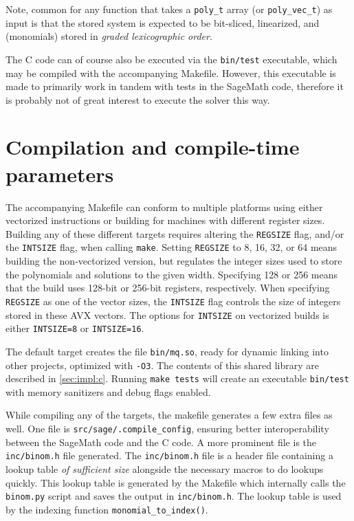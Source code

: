 Note, common for any function that takes a \texttt{poly\_t} array (or \texttt{poly\_vec\_t}) as input is that the stored system is expected to be bit-sliced, linearized, and (monomials) stored in \textit{graded lexicographic order}.

The C code can of course also be executed via the \texttt{bin/test} executable, which may be compiled with the accompanying Makefile. However, this executable is made to primarily work in tandem with tests in the SageMath code, therefore it is probably not of great interest to execute the solver this way.

\section{Compilation and compile-time parameters} \label{sec:impl:compile}
The accompanying Makefile can conform to multiple platforms using either vectorized instructions or building for machines with different register sizes. Building any of these different targets requires altering the \texttt{REGSIZE} flag, and/or the \texttt{INTSIZE} flag, when calling \texttt{make}. Setting \texttt{REGSIZE} to 8, 16, 32, or 64 means building the non-vectorized version, but regulates the integer sizes used to store the polynomials and solutions to the given width. Specifying 128 or 256 means that the build uses 128-bit or 256-bit registers, respectively. When specifying \texttt{REGSIZE} as one of the vector sizes, the \texttt{INTSIZE} flag controls the size of integers stored in these AVX vectors. The options for \texttt{INTSIZE} on vectorized builds is either \texttt{INTSIZE=8} or \texttt{INTSIZE=16}.

The default target creates the file \texttt{bin/mq.so}, ready for dynamic linking into other projects, optimized with \texttt{-O3}. The contents of this shared library are described in \cref{sec:impl:c}. Running \texttt{make tests} will create an executable \texttt{bin/test} with memory sanitizers and debug flags enabled. 

While compiling any of the targets, the makefile generates a few extra files as well. One file is \texttt{src/sage/.compile\_config}, ensuring better interoperability between the SageMath code and the C code. A more prominent file is the \texttt{inc/binom.h} file generated. The \texttt{inc/binom.h} file is a header file containing a lookup table \textit{of sufficient size} alongside the necessary macros to do lookups quickly. This lookup table is generated by the Makefile which internally calls the \texttt{binom.py} script and saves the output in \texttt{inc/binom.h}. The lookup table is used by the indexing function \texttt{monomial\_to\_index()}.